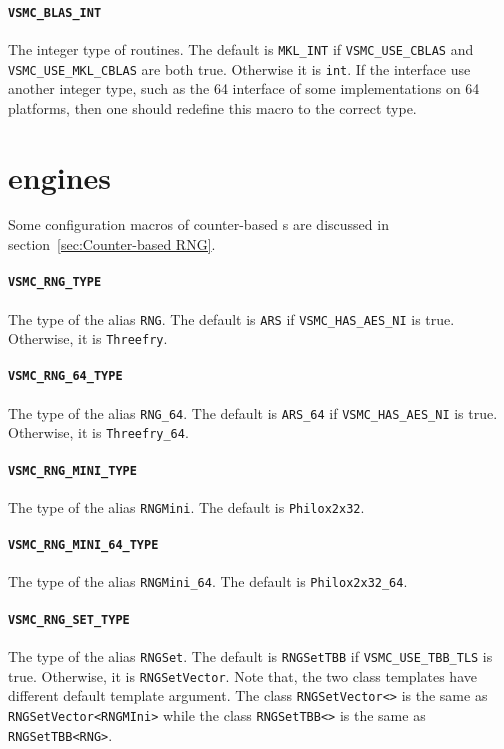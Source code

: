 \paragraph{\texttt{VSMC\_BLAS\_INT}} The integer type of \blas routines. The
default is \verb|MKL_INT| if \verb|VSMC_USE_CBLAS| and
\verb|VSMC_USE_MKL_CBLAS| are both true. Otherwise it is \verb|int|. If the
\blas interface use another integer type, such as the \ilp{}64 interface of
some implementations on \lp{}64 platforms, then one should redefine this macro
to the correct type.

\section{\protect\rng engines}
\label{sec:RNG engines}

Some configuration macros of counter-based \rng{}s are discussed in
section~\ref{sec:Counter-based RNG}.

\paragraph{\texttt{VSMC\_RNG\_TYPE}} The type of the alias \verb|RNG|. The
default is \verb|ARS| if \verb|VSMC_HAS_AES_NI| is true. Otherwise, it is
\verb|Threefry|.

\paragraph{\texttt{VSMC\_RNG\_64\_TYPE}} The type of the alias \verb|RNG_64|.
The default is \verb|ARS_64| if \verb|VSMC_HAS_AES_NI| is true. Otherwise, it
is \verb|Threefry_64|.

\paragraph{\texttt{VSMC\_RNG\_MINI\_TYPE}} The type of the alias
\verb|RNGMini|.  The default is \verb|Philox2x32|.

\paragraph{\texttt{VSMC\_RNG\_MINI\_64\_TYPE}} The type of the alias
\verb|RNGMini_64|. The default is \verb|Philox2x32_64|.

\paragraph{\texttt{VSMC\_RNG\_SET\_TYPE}} The type of the alias \verb|RNGSet|.
The default is \verb|RNGSetTBB| if \verb|VSMC_USE_TBB_TLS| is true. Otherwise,
it is \verb|RNGSetVector|. Note that, the two class templates have different
default template argument. The class \verb|RNGSetVector<>| is the same as
\verb|RNGSetVector<RNGMIni>| while the class \verb|RNGSetTBB<>| is the same as
\verb|RNGSetTBB<RNG>|.


